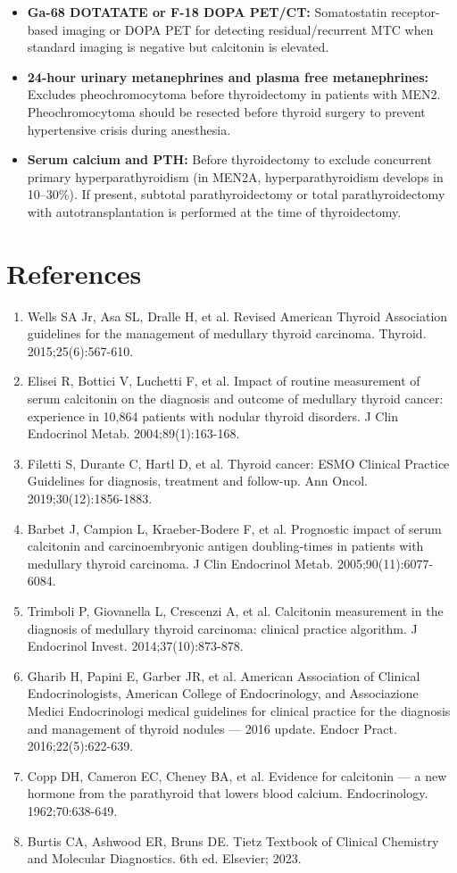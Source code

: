 \begin{itemize}
  \item \textbf{Ga-68 DOTATATE or F-18 DOPA PET/CT:} Somatostatin receptor-based imaging or DOPA PET for detecting residual/recurrent MTC when standard imaging is negative but calcitonin is elevated.
  \item \textbf{24-hour urinary metanephrines and plasma free metanephrines:} Excludes pheochromocytoma before thyroidectomy in patients with MEN2. Pheochromocytoma should be resected before thyroid surgery to prevent hypertensive crisis during anesthesia.
  \item \textbf{Serum calcium and PTH:} Before thyroidectomy to exclude concurrent primary hyperparathyroidism (in MEN2A, hyperparathyroidism develops in 10--30\%). If present, subtotal parathyroidectomy or total parathyroidectomy with autotransplantation is performed at the time of thyroidectomy.
\end{itemize}

\section*{References}
\begin{enumerate}
  \item Wells SA Jr, Asa SL, Dralle H, et al. Revised American Thyroid Association guidelines for the management of medullary thyroid carcinoma. Thyroid. 2015;25(6):567-610.
  \item Elisei R, Bottici V, Luchetti F, et al. Impact of routine measurement of serum calcitonin on the diagnosis and outcome of medullary thyroid cancer: experience in 10,864 patients with nodular thyroid disorders. J Clin Endocrinol Metab. 2004;89(1):163-168.
  \item Filetti S, Durante C, Hartl D, et al. Thyroid cancer: ESMO Clinical Practice Guidelines for diagnosis, treatment and follow-up. Ann Oncol. 2019;30(12):1856-1883.
  \item Barbet J, Campion L, Kraeber-Bodere F, et al. Prognostic impact of serum calcitonin and carcinoembryonic antigen doubling-times in patients with medullary thyroid carcinoma. J Clin Endocrinol Metab. 2005;90(11):6077-6084.
  \item Trimboli P, Giovanella L, Crescenzi A, et al. Calcitonin measurement in the diagnosis of medullary thyroid carcinoma: clinical practice algorithm. J Endocrinol Invest. 2014;37(10):873-878.
  \item Gharib H, Papini E, Garber JR, et al. American Association of Clinical Endocrinologists, American College of Endocrinology, and Associazione Medici Endocrinologi medical guidelines for clinical practice for the diagnosis and management of thyroid nodules --- 2016 update. Endocr Pract. 2016;22(5):622-639.
  \item Copp DH, Cameron EC, Cheney BA, et al. Evidence for calcitonin --- a new hormone from the parathyroid that lowers blood calcium. Endocrinology. 1962;70:638-649.
  \item Burtis CA, Ashwood ER, Bruns DE. Tietz Textbook of Clinical Chemistry and Molecular Diagnostics. 6th ed. Elsevier; 2023.
\end{enumerate}

\clearpage
